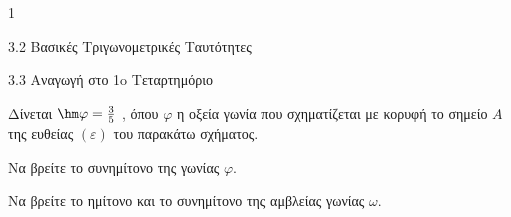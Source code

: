 \begin{ylh}{1}
\item 3.2 Βασικές Τριγωνομετρικές Ταυτότητες
\item 3.3 Αναγωγή στο 1o Τεταρτημόριο
\end{ylh}
Δίνεται $\hm \varphi = \frac{3}{5}$ , όπου $\varphi$ η οξεία γωνία που σχηματίζεται με κορυφή το σημείο $A$ της ευθείας $(\varepsilon)$ του παρακάτω σχήματος.
\begin{center}
\end{center}
\begin{alist}
\item Να βρείτε το συνημίτονο της γωνίας $\varphi$.
\item Να βρείτε το ημίτονο και το συνημίτονο της αμβλείας γωνίας $\omega$.
\end{alist}

